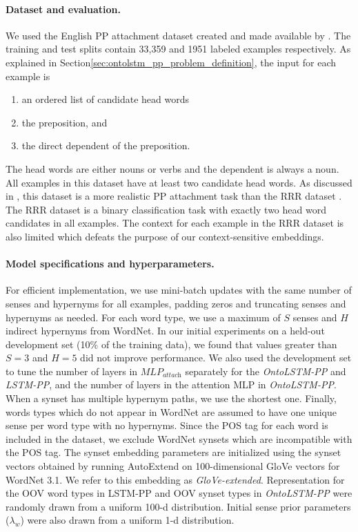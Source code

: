 \paragraph{Dataset and evaluation.} We used the English PP attachment dataset created and made available by \cite{belinkov2014exploring}. The training and test splits contain 33,359 and 1951 labeled examples respectively. As explained in Section\ref{sec:ontolstm_pp_problem_definition}, the input for each example is
\begin{enumerate}
	\item an ordered list of candidate head words
	\item the preposition, and
	\item the direct dependent of the preposition.
\end{enumerate}
The head words are either nouns or verbs and the dependent is always a noun. 
All examples in this dataset have at least two candidate head words.
As discussed in \cite{belinkov2014exploring}, this dataset is a more realistic PP attachment task than the RRR dataset \citep{ratnaparkhi1994maximum}.
The RRR dataset is a binary classification task with exactly two head word candidates in all examples.
The context for each example in the RRR dataset is also limited which defeats the purpose of our context-sensitive embeddings.

\paragraph{Model specifications and hyperparameters.} 
For efficient implementation, we use mini-batch updates with the same number of senses and hypernyms for all examples, padding zeros and truncating senses and hypernyms as needed.
For each word type, we use a maximum of $S$ senses and $H$ indirect hypernyms from WordNet.
In our initial experiments on a held-out development set (10\% of the training data), we found that values greater than $S=3$ and $H=5$ did not improve performance. We also used the development set to tune the number of layers in $\textit{MLP}_{\textit{attach}}$ separately for the \textit{OntoLSTM-PP} and \textit{LSTM-PP}, and the number of layers in the attention MLP in \textit{OntoLSTM-PP}.
When a synset has multiple hypernym paths, we use the shortest one. 
Finally, words types which do not appear in WordNet are assumed to have one unique sense per word type with no hypernyms. Since the POS tag for each word is included in the dataset, we exclude WordNet synsets which are incompatible with the POS tag.
The synset embedding parameters are initialized using the synset vectors obtained by running AutoExtend \citep{rothe:15} on 100-dimensional GloVe \citep{pennington2014glove} vectors for WordNet 3.1. We refer to this embedding as \textit{GloVe-extended}. Representation for the OOV word types in LSTM-PP and OOV synset types in \textit{OntoLSTM-PP} were randomly drawn from a uniform 100-d distribution. 
Initial sense prior parameters ($\lambda_w$) were also drawn from a uniform 1-d distribution.

